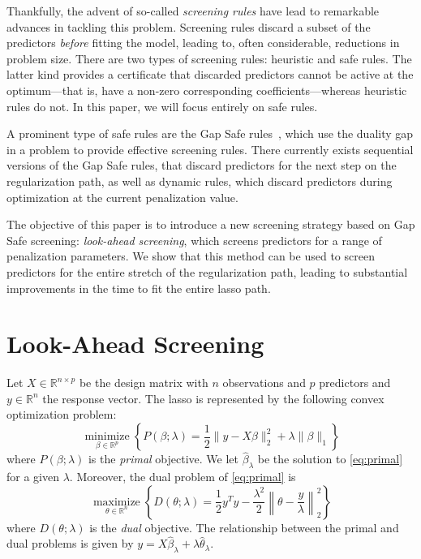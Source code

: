 \documentclass[b5paper,10pt,abstractoff,DIV=calc,headings=normal,twoside]{scrartcl}
\theoremstyle{plain}
\theoremstyle{definition}
\theoremstyle{remark}
\begin{document}
Thankfully, the advent of so-called \emph{screening rules} have lead to
remarkable advances in tackling this problem. Screening rules discard a
subset of the predictors \emph{before} fitting the model, leading to, often
considerable, reductions in problem size. There are two types of screening
rules: heuristic and safe rules.
The latter kind provides a certificate that discarded predictors cannot be
active at the optimum---that is, have a non-zero corresponding
coefficients---whereas heuristic rules do not. In this paper, we will
focus entirely on safe rules.

A prominent type of safe rules are the Gap Safe
rules~\citep{ndiaye2017,fercoq2015}, which use the duality gap in a problem
to provide effective screening rules. There currently exists
sequential versions of
the Gap Safe rules, that discard predictors for the next step on the
regularization path, as well as dynamic rules, which discard predictors
during optimization at the current penalization value.

The objective of this paper is to introduce a new screening strategy based
on Gap Safe screening: \emph{look-ahead screening}, which
screens predictors for a range of penalization parameters. We
show that this method can be used to screen predictors for the entire
stretch of the regularization path, leading to substantial improvements in
the time to fit the entire lasso path.

\section{Look-Ahead Screening}%
\label{sec:look-ahead-screening}

Let \(X \in \mathbb{R}^{n \times p}\) be the design matrix with \(n\)
observations and \(p\) predictors
and \(y \in \mathbb{R}^n\) the response vector.
The lasso is represented by the following convex optimization problem:
\begin{equation}
  \label{eq:primal}
  \operatorname*{minimize}_{\beta \in \mathbb{R}^p} \left\{P(\beta; \lambda)
  = \frac 1 2 \lVert y - X\beta \rVert_2^2 + \lambda \lVert \beta \rVert_1\right\}
\end{equation}
where \(P(\beta;\lambda)\)
is the \emph{primal} objective. We let \(\hat \beta_\lambda\) be the solution to
\eqref{eq:primal} for a given \(\lambda\).
Moreover, the dual problem of \eqref{eq:primal} is
\begin{equation}
  \label{eq:dual}
  \operatorname*{maximize}_{\theta \in \mathbb{R}^n} \left\{ D(\theta; \lambda) =
  \frac 12 y^T y - \frac{\lambda^2}{2} \left\lVert \theta
  - \frac y \lambda \right\rVert_2^2\right\}
\end{equation}
where \(D(\theta; \lambda)\) is the \emph{dual} objective.
The relationship between the primal and dual problems is given by
\(y = X\hat\beta_\lambda + \lambda \hat\theta_\lambda.\)
\end{document}

